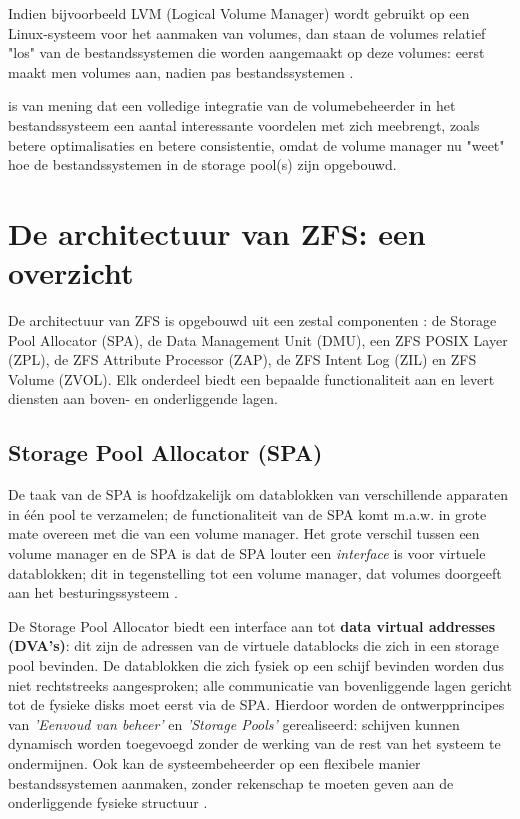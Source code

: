 Indien bijvoorbeeld LVM (Logical Volume Manager) wordt gebruikt op een Linux-systeem voor het aanmaken van volumes, dan staan de volumes relatief "los"  van de bestandssystemen die worden aangemaakt op deze volumes: eerst maakt men volumes aan, nadien pas bestandssystemen \autocite{Lewis2006}. 

\textcite{ZFSBonwick} is van mening dat een volledige integratie van de volumebeheerder in het bestandssysteem een aantal interessante voordelen met zich meebrengt, zoals betere optimalisaties en betere consistentie, omdat de volume manager nu "weet" hoe de bestandssystemen in de storage pool(s) zijn opgebouwd.

\section{De architectuur van ZFS: een overzicht}

De architectuur van ZFS is opgebouwd uit een zestal componenten \autocite{Li2009}: de Storage Pool Allocator (SPA), de Data Management Unit (DMU), een ZFS POSIX Layer (ZPL), de ZFS Attribute Processor (ZAP), de ZFS Intent Log (ZIL) en ZFS Volume (ZVOL). Elk onderdeel biedt een bepaalde functionaliteit aan en levert diensten aan boven- en onderliggende lagen.

\subsection{Storage Pool Allocator (SPA)}

De taak van de SPA is hoofdzakelijk om datablokken van verschillende apparaten in één pool te verzamelen; de functionaliteit van de SPA komt m.a.w. in grote mate overeen met die van een volume manager. Het grote verschil tussen een volume manager en de SPA is dat de SPA louter een \textit{interface} is voor virtuele datablokken; dit in tegenstelling tot een volume manager, dat volumes doorgeeft aan het besturingssysteem \autocite{ZFSBonwick}. 

De Storage Pool Allocator biedt een interface aan tot \textbf{data virtual addresses (DVA's)}: dit zijn de adressen van de virtuele datablocks die zich in een storage pool bevinden. De datablokken die zich fysiek op een schijf bevinden worden dus niet rechtstreeks aangesproken; alle communicatie van bovenliggende lagen gericht tot de fysieke disks moet eerst via de SPA. Hierdoor worden de ontwerpprincipes van \textit{'Eenvoud van beheer'} en \textit{'Storage Pools'} gerealiseerd: schijven kunnen dynamisch worden toegevoegd zonder de werking van de rest van het systeem te ondermijnen. Ook kan de systeembeheerder op een flexibele manier bestandssystemen aanmaken, zonder rekenschap te moeten geven aan de onderliggende fysieke structuur \autocite{ZFSBonwick}.

